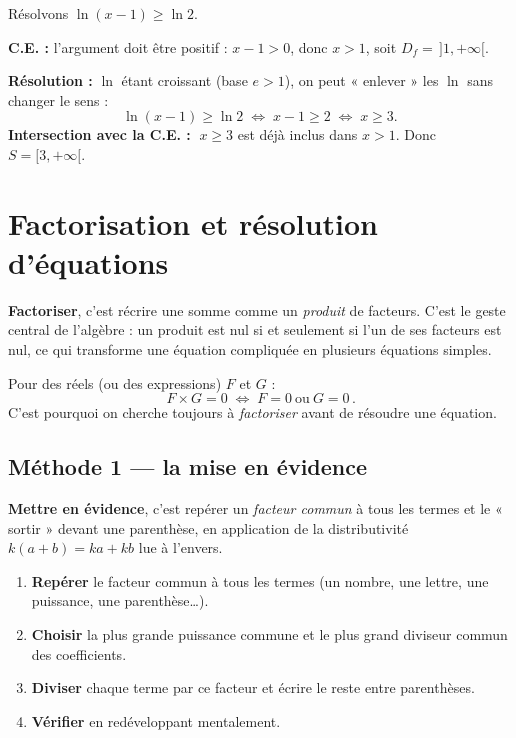 \documentclass[11pt,a4paper]{article}
\begin{document}
\begin{exemple}
Résolvons $\ln(x-1)\geq \ln 2$.

\textbf{C.E. :} l'argument doit être positif : $x-1>0$, donc $x>1$, soit $D_f=\,]1,+\infty[$.

\textbf{Résolution :} $\ln$ étant croissant (base $e>1$), on peut « enlever » les $\ln$ sans changer le sens :
\[ \ln(x-1)\geq\ln 2 \;\Longleftrightarrow\; x-1\geq 2 \;\Longleftrightarrow\; x\geq 3. \]
\textbf{Intersection avec la C.E. :} $\;x\geq 3$ est déjà inclus dans $x>1$. Donc $S=[3,+\infty[$.
\end{exemple}

\section{Factorisation et résolution d'équations}
\textbf{Factoriser}, c'est récrire une somme comme un \emph{produit} de facteurs. C'est le geste central
de l'algèbre : un produit est nul si et seulement si l'un de ses facteurs est nul, ce qui transforme
une équation compliquée en plusieurs équations simples.

\begin{theoreme}
Pour des réels (ou des expressions) $F$ et $G$ :
\[ \boxed{\,F\times G=0 \;\Longleftrightarrow\; F=0\ \text{ou}\ G=0\,}. \]
C'est pourquoi on cherche toujours à \emph{factoriser} avant de résoudre une équation.
\end{theoreme}

\subsection{Méthode 1 — la mise en évidence}

\begin{definition}
\textbf{Mettre en évidence}, c'est repérer un \emph{facteur commun} à tous les termes et le « sortir »
devant une parenthèse, en application de la distributivité $k(a+b)=ka+kb$ lue à l'envers.
\end{definition}

\begin{commentfaire}
\begin{enumerate}[leftmargin=2em,topsep=2pt,itemsep=2pt]
  \item \textbf{Repérer} le facteur commun à tous les termes (un nombre, une lettre, une puissance, une parenthèse\dots).
  \item \textbf{Choisir} la plus grande puissance commune et le plus grand diviseur commun des coefficients.
  \item \textbf{Diviser} chaque terme par ce facteur et écrire le reste entre parenthèses.
  \item \textbf{Vérifier} en redéveloppant mentalement.
\end{enumerate}
\end{commentfaire}
\end{document}
